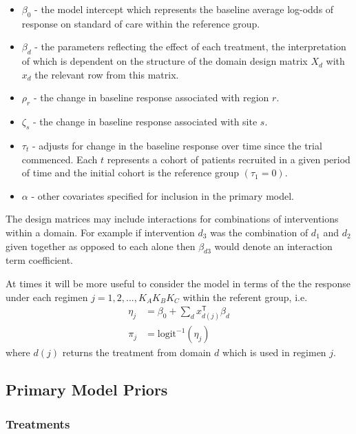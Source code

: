 \documentclass[
  11pt,
]{article}
\providecommand{\tightlist}{%
  \setlength{\itemsep}{0pt}\setlength{\parskip}{0pt}}
\begin{document}
\begin{itemize}
\tightlist
\item
  \(\beta_0\) - the model intercept which represents the baseline average log-odds of response on standard of care within the reference group.
\item
  \(\beta_d\) - the parameters reflecting the effect of each treatment, the interpretation of which is dependent on the structure of the domain design matrix \(X_d\) with \(x_{d}\) the relevant row from this matrix.
\item
  \(\rho_r\) - the change in baseline response associated with region \(r\).
\item
  \(\zeta_s\) - the change in baseline response associated with site \(s\).
\item
  \(\tau_t\) - adjusts for change in the baseline response over time since the trial commenced. Each \(t\) represents a cohort of patients recruited in a given period of time and the initial cohort is the reference group \((\tau_1 = 0)\).
\item
  \(\alpha\) - other covariates specified for inclusion in the primary model.
\end{itemize}

The design matrices may include interactions for combinations of interventions within a domain.
For example if intervention \(d_3\) was the combination of \(d_1\) and \(d_2\) given together as opposed to each alone then \(\beta_{d3}\) would denote an interaction term coefficient.

At times it will be more useful to consider the model in terms of the the response under each regimen \(j=1,2,...,K_AK_BK_C\) within the referent group, i.e.
\[
\begin{aligned}
\eta_j &= \beta_0 + \sum_{d} x_{d(j)}^{\mathsf{T}}\beta_d \\
\pi_j &= \text{logit}^{-1}(\eta_j)
\end{aligned}
\]
where \(d(j)\) returns the treatment from domain \(d\) which is used in regimen \(j\).

\hypertarget{primary-model-priors}{%
\subsection{Primary Model Priors}\label{primary-model-priors}}

\hypertarget{treatments}{%
\subsubsection{Treatments}\label{treatments}}
\end{document}
